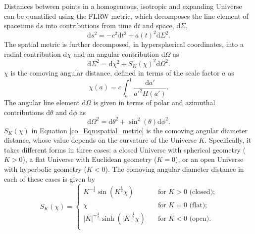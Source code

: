 Distances between points in a homogeneous, isotropic and expanding Universe can be quantified using the FLRW metric, which decomposes the line element of spacetime $\text{d}s$ into contributions from time $\text{d}t$ and space, $\text{d}\Sigma$,
\begin{equation}
\text{d}s^2 = - c^2 \text{d}t^2 + a \left( t \right)^2
\text{d}\Sigma^2.
\end{equation}
The spatial metric is further decomposed, in hyperspherical coordinates, into a radial contribution $\text{d}\chi$ and an angular contribution $\text{d}\Omega$ as
\begin{equation}
\text{d}\Sigma^2 = \text{d}\chi^2 + S_K \left( \chi \right)^2
\text{d}\Omega^2.
\label{co_Eqn:spatial_metric}
\end{equation}
$\chi$ is the comoving angular distance, defined in terms of the scale factor $a$ as
\begin{equation}
\chi \left( a \right) = c \int_a^1 {
\frac{ \text{d}a' }{a'^2 H \left( a' \right)}
}.
\end{equation}
The angular line element $\text{d}\Omega$ is given in terms of polar and azimuthal contributions $\text{d}\theta$ and $\text{d}\phi$ as
\begin{equation}
\text{d}\Omega^2 = \text{d}\theta^2
+ \sin^2 \left( \theta \right) \text{d}\phi^2.
\end{equation}
$S_K \left( \chi \right)$ in Equation \eqref{co_Eqn:spatial_metric} is the comoving angular diameter distance, whose value depends on the curvature of the Universe $K$. Specifically, it takes different forms in three cases: a closed Universe with spherical geometry ($K > 0$), a flat Universe with Euclidean geometry ($K = 0$), or an open Universe with hyperbolic geometry ($K < 0$). The comoving angular diameter distance in each of these cases is given by
\begin{equation}
S_K \left( \chi \right) =
\begin{cases}
K^{-\frac{1}{2}} \sin{\left( K^{\frac{1}{2}} \chi \right)}
& \quad \text{for $K > 0$ (closed);} \\
\chi
& \quad \text{for $K = 0$ (flat);} \\
\left| K \right|^{-\frac{1}{2}}
\sinh{\left( \left| K \right|^{\frac{1}{2}} \chi \right)}
& \quad \text{for $K < 0$ (open).} \\
\end{cases}
\label{co_Eqn:angular_diameter_distance}
\end{equation}


